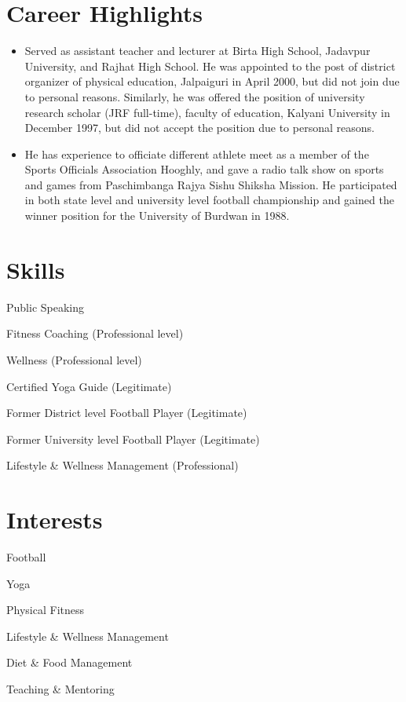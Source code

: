 \documentclass[letterpaper,11pt]{article}
\newcommand{\resumeItem}[1]{\item\small{{#1 \vspace{0pt}}}}
\newcommand{\resumeSubHeadingListStart}{\begin{itemize}[leftmargin=0.0in, label={}]}
\newcommand{\resumeSubHeadingListEnd}{\end{itemize}\vspace{0pt}}
\begin{document}
\section{Career Highlights}
  \resumeSubHeadingListStart
    \resumeItem{Served as assistant teacher and lecturer at Birta High School, Jadavpur University, and Rajhat High School. He was appointed to the post of district organizer of physical education, Jalpaiguri in April 2000, but did not join due to personal reasons. Similarly, he was offered the position of university research scholar (JRF full-time), faculty of education, Kalyani University in December 1997, but did not accept the position due to personal reasons.}
    \resumeItem{He has experience to officiate different athlete meet as a member of the Sports Officials Association Hooghly, and gave a radio talk show on sports and games from Paschimbanga Rajya Sishu Shiksha Mission. He participated in both state level and university level football championship and gained the winner position for the University of Burdwan in 1988.}
  \resumeSubHeadingListEnd

\section{Skills}
  \begin{multicols}{2}
  \begin{itemize}[leftmargin=0.2in, label={$\bullet$}]
    \small{\item{Public Speaking}}
    \small{\item{Fitness Coaching (Professional level)}}
    \small{\item{Wellness (Professional level)}}
    \small{\item{Certified Yoga Guide (Legitimate)}}
    \small{\item{Former District level Football Player (Legitimate)}}
    \small{\item{Former University level Football Player (Legitimate)}}
    \small{\item{Lifestyle \& Wellness Management (Professional)}}
  \end{itemize}
  \end{multicols}
  \vspace{10pt}

\section{Interests}
  \begin{multicols}{2}
  \begin{itemize}[leftmargin=0.2in, label={$\bullet$}]
    \small{\item{Football}}
    \small{\item{Yoga}}
    \small{\item{Physical Fitness}}
    \small{\item{Lifestyle \& Wellness Management}}
    \small{\item{Diet \& Food Management}}
    \small{\item{Teaching \& Mentoring}}
  \end{itemize}
  \end{multicols}
  \vspace{10pt}
\end{document}
